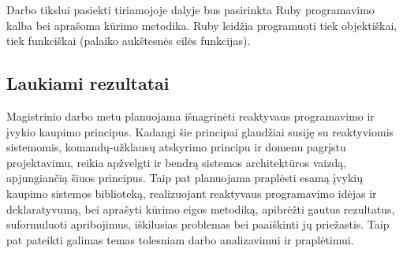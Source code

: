     Darbo tikslui pasiekti tiriamojoje dalyje bus pasirinkta Ruby programavimo kalba bei aprašoma kūrimo metodika. Ruby leidžia programuoti tiek objektiškai, tiek funkciškai (palaiko aukštesnės eilės funkcijas).

\subsection{Laukiami rezultatai}

    Magistrinio darbo metu planuojama išnagrinėti reaktyvaus programavimo ir įvykio kaupimo principus. Kadangi šie principai glaudžiai susiję su reaktyviomis sistemomis, komandų-užklausų atskyrimo principu ir domenu pagrįstu projektavimu, reikia apžvelgti ir bendrą sistemos architektūros vaizdą, apjungiančią šiuos principus. Taip pat planuojama praplėsti esamą įvykių kaupimo sistemos biblioteką, realizuojant reaktyvaus programavimo idėjas ir deklaratyvumą, bei aprašyti kūrimo eigos metodiką, apibrėžti gautus rezultatus, suformuluoti apribojimus, iškilusias problemas bei paaiškinti jų priežastis. Taip pat pateikti galimas temas tolesniam darbo analizavimui ir praplėtimui.
